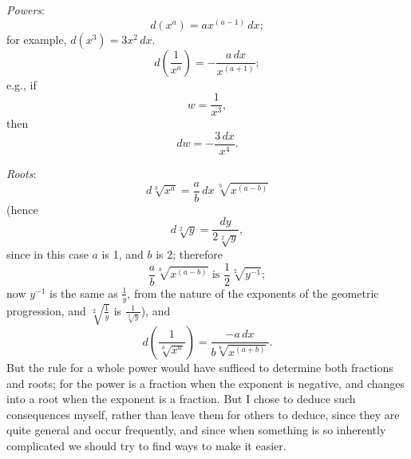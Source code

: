 \documentclass[polutonikogreek,english,twoside,openright]{article}
\begin{document}
\vspace*{1ex} {\em Powers}: $$d(x^a) = ax^{(a-1)}\,dx;$$ for example,
$d(x^3) = 3x^2\,dx$.
$$d\left(\frac{1}{x^a}\right) = - \frac{a\,dx}{x^{(a+1)}};$$ e.g., if 
$$w =\frac{1}{x^3},$$ then 
$$dw = -\frac{3\,dx}{x^4}.$$

\vspace*{1ex} {\em Roots}:
$$d\sqrt[b]{x^a} = \frac{a}{b}\,dx\,\sqrt[b]{x^{(a-b)}}$$ (hence
$$d\sqrt[2]{y} = \frac{dy}{2\sqrt[2]{y}},$$ since in this case $a$ is 1, and
$b$ is 2; therefore
$$ \frac{a}{b}\sqrt[b]{x^{(a-b)}} \mbox{ is } \frac{1}{2}\sqrt[2]{y^{-1}};$$ now
$y^{-1}$ is the same as $\frac{1}{y}$, from the nature of the
exponents of the geometric progression, and $\sqrt[2]{\frac{1}{y}}$ is
$\frac{1}{\sqrt[2]{y}}$), and
$$d\left(\frac{1}{\sqrt[b]{x^a}}\right) = \frac{-a\,dx}{b\sqrt[b]{x^{(a+b)}}}.$$ But the rule
for a whole power would have sufficed to determine both fractions and
roots; for the power is a fraction when the exponent is negative, and
changes into a root when the exponent is a fraction. But I chose to deduce such consequences myself,
rather than leave them for others to deduce, since they are quite
general and occur frequently, and since when something is so
inherently complicated we should try to find ways to make it
easier.
\end{document}
